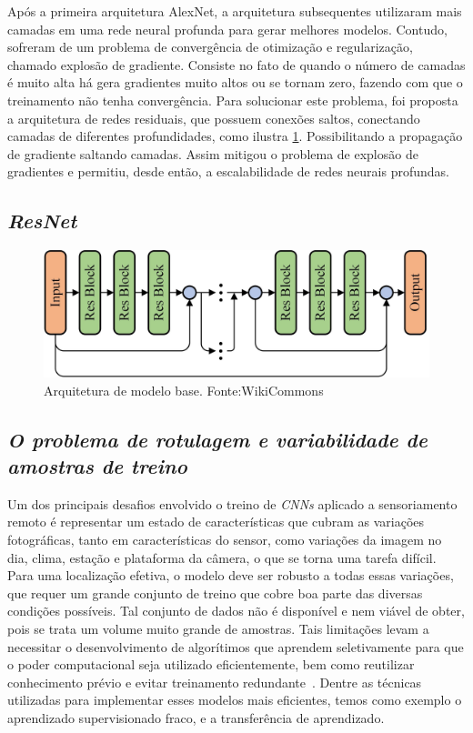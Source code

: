 Após a primeira arquitetura AlexNet, a arquitetura subsequentes utilizaram mais camadas em uma rede neural profunda para gerar melhores modelos. Contudo, sofreram de um problema de convergência de otimização e regularização, chamado explosão de gradiente. Consiste no fato de quando o número de camadas é muito alta há gera gradientes muito altos ou se tornam zero, fazendo com que o treinamento não tenha convergência. 
Para solucionar este problema, foi proposta a arquitetura de redes residuais, que possuem conexões saltos, conectando camadas de diferentes profundidades, como ilustra \ref{fig:ResNet-Rsp}. Possibilitando a propagação de gradiente saltando camadas. Assim mitigou o problema de explosão de gradientes e permitiu, desde então, a escalabilidade de redes neurais profundas. 


\subsection{\textit{ResNet}}\label{sec:Cap2_ResNet}
\begin{figure}[!ht]
    \centering
    \includegraphics[width=0.9\columnwidth]{Imagens/An-illustration-of-the-deep-residual-network-ResNet-structure-More-shortcut.jpg}
    \caption{ Arquitetura de modelo base. Fonte:WikiCommons}
   \label{fig:ResNet-Rsp}
\end{figure}


\subsection{\textit{O problema de rotulagem e variabilidade de amostras de treino}}\label{sec:Cap2_rotulagem}

Um dos principais desafios envolvido o treino de \textit{CNNs} aplicado a sensoriamento remoto é representar um estado de características que cubram as variações fotográficas, tanto em características do sensor, como variações da imagem no dia, clima, estação e plataforma da câmera, o que se torna uma tarefa difícil. Para uma localização efetiva, o modelo deve ser robusto a todas essas variações, que requer um grande conjunto de treino que cobre boa parte das diversas condições possíveis. Tal conjunto de dados não é disponível e nem viável de obter, pois se trata um volume muito grande de amostras. Tais limitações levam a necessitar o desenvolvimento de algorítimos que aprendem seletivamente para que o poder computacional seja utilizado eficientemente, bem como reutilizar conhecimento prévio e evitar treinamento redundante~\cite{rostami2019learning}.  Dentre as técnicas utilizadas para implementar esses modelos mais eficientes, temos como exemplo o aprendizado supervisionado fraco, e a transferência de aprendizado.

